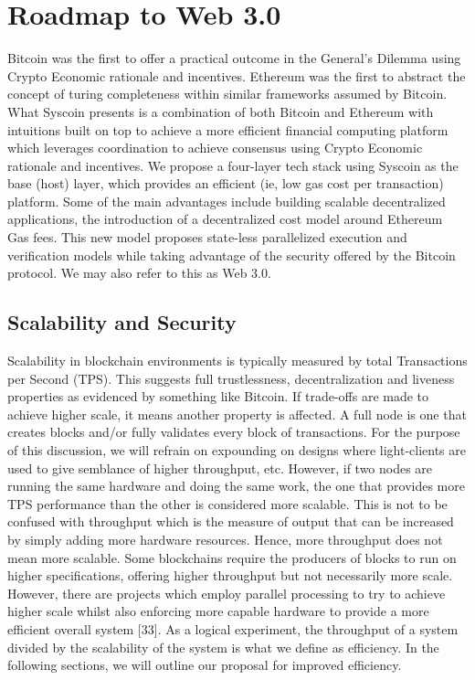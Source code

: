 \documentclass[peerreview]{ieeesyscoin}
\begin{document}
\section{Roadmap to Web 3.0}
\label{section:roadmap}

Bitcoin was the first to offer a practical outcome in the General's Dilemma using Crypto Economic rationale and incentives. Ethereum was the first to abstract the concept of turing completeness within similar frameworks assumed by Bitcoin. What Syscoin presents is a combination of both Bitcoin and Ethereum with intuitions built on top to achieve a more efficient financial computing platform which leverages coordination to achieve consensus using Crypto Economic rationale and incentives. We propose a four-layer tech stack using Syscoin as the base (host) layer, which provides an efficient (ie, low gas cost per transaction) platform. Some of the main advantages include building scalable decentralized applications, the introduction of a decentralized cost model around Ethereum Gas fees. This new model proposes state-less parallelized execution and verification models while taking advantage of the security offered by the Bitcoin protocol. We may also refer to this as Web 3.0.

\subsection{Scalability and Security}

Scalability in blockchain environments is typically measured by total Transactions per Second (TPS). This suggests full trustlessness, decentralization and liveness properties as evidenced by something like Bitcoin. If trade-offs are made to achieve higher scale, it means another property is affected. A full node is one that creates blocks and/or fully validates every block of transactions. For the purpose of this discussion, we will refrain on expounding on designs where light-clients are used to give semblance of higher throughput, etc. However, if two nodes are running the same hardware and doing the same work, the one that provides more TPS performance than the other is considered more scalable. This is not to be confused with throughput which is the measure of output that can be increased by simply adding more hardware resources. Hence, more throughput does not mean more scalable. Some blockchains require the producers of blocks to run on higher specifications, offering higher throughput but not necessarily more scale. However, there are projects which employ parallel processing to try to achieve higher scale whilst also enforcing more capable hardware to provide a more efficient overall system [33]. As a logical experiment, the throughput of a system divided by the scalability of the system is what we define as efficiency. In the following sections, we will outline our proposal for improved efficiency.
\end{document}
